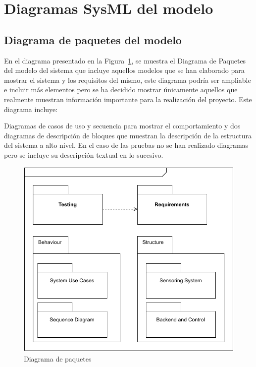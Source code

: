 \newpage

\section{Diagramas SysML del modelo}

\subsection{Diagrama de paquetes del modelo}

En el diagrama presentado en la Figura~\ref{fig:diagramaPaquetes}, se muestra el Diagrama de Paquetes del modelo del sistema que incluye aquellos modelos que se han elaborado para mostrar el sistema y los requisitos del mismo, este diagrama podría ser ampliable e incluir más elementos pero se ha decidido mostrar únicamente aquellos que realmente muestran información importante para la realización del proyecto. Este diagrama incluye:

Diagramas de casos de uso y secuencia para mostrar el comportamiento y dos diagramas de descripción de bloques que muestran la descripción de la estructura del sistema a alto nivel. En el caso de las pruebas no se han realizado diagramas pero se incluye su descripción textual en lo sucesivo.


\begin{figure}[h!]
\centering
\includegraphics{images/diagramaDePaquetes.pdf}
\caption{Diagrama de paquetes}%
\label{fig:diagramaPaquetes}
\end{figure}

